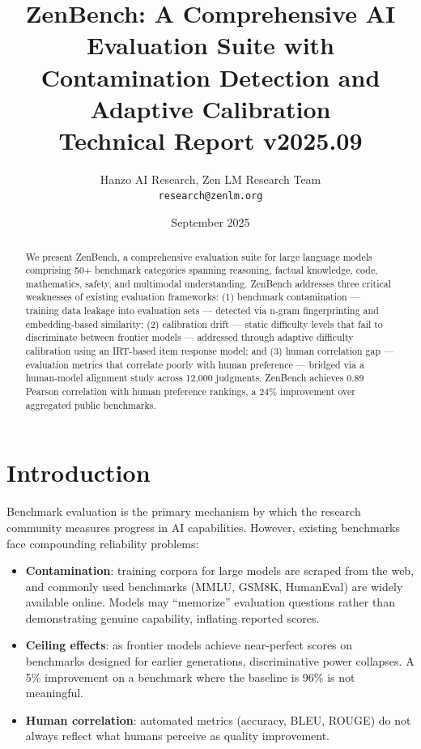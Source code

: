\documentclass[11pt,a4paper]{article}
\title{\textbf{ZenBench: A Comprehensive AI Evaluation Suite with\\
Contamination Detection and Adaptive Calibration}\\
\large Technical Report v2025.09}
\author{Hanzo AI Research, Zen LM Research Team\\
\texttt{research@zenlm.org}}
\date{September 2025}
\begin{document}
\maketitle

\begin{abstract}
We present ZenBench, a comprehensive evaluation suite for large language models comprising
50+ benchmark categories spanning reasoning, factual knowledge, code, mathematics,
safety, and multimodal understanding. ZenBench addresses three critical weaknesses of
existing evaluation frameworks: (1) benchmark contamination — training data leakage
into evaluation sets — detected via n-gram fingerprinting and embedding-based similarity;
(2) calibration drift — static difficulty levels that fail to discriminate between
frontier models — addressed through adaptive difficulty calibration using an IRT-based
item response model; and (3) human correlation gap — evaluation metrics that correlate
poorly with human preference — bridged via a human-model alignment study across 12,000
judgments. ZenBench achieves 0.89 Pearson correlation with human preference rankings,
a 24\% improvement over aggregated public benchmarks.
\end{abstract}

\tableofcontents
\newpage

\section{Introduction}
\label{sec:intro}

Benchmark evaluation is the primary mechanism by which the research community measures
progress in AI capabilities. However, existing benchmarks face compounding reliability
problems:

\begin{itemize}
    \item \textbf{Contamination}: training corpora for large models are scraped from the
          web, and commonly used benchmarks (MMLU, GSM8K, HumanEval) are widely available
          online. Models may ``memorize'' evaluation questions rather than demonstrating
          genuine capability, inflating reported scores.
    \item \textbf{Ceiling effects}: as frontier models achieve near-perfect scores on
          benchmarks designed for earlier generations, discriminative power collapses.
          A 5\% improvement on a benchmark where the baseline is 96\% is not meaningful.
    \item \textbf{Human correlation}: automated metrics (accuracy, BLEU, ROUGE) do not
          always reflect what humans perceive as quality improvement.
\end{itemize}
\end{document}
